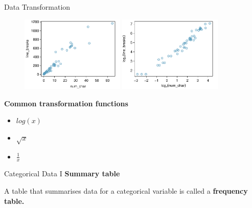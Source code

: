 \documentclass[12pt,a4paper]{beamer}
\begin{document}
\begin{frame}{Data Transformation}
\begin{figure}
\includegraphics[width=0.44\textwidth]{figures/email50LinesCharactersMod/email50LinesCharactersMod}
\includegraphics[width=0.44\textwidth]{figures/email50LinesCharactersMod/email50LinesCharactersModLog}
\end{figure}
\textbf{Common transformation functions}
\begin{itemize}
\item $log(x)$
\item $\sqrt{x}$
\item $\frac{1}{x}$
\end{itemize}
\end{frame}
\begin{frame}{Categorical Data I}
\textbf{Summary table}
\begin{table}[htb]
	\centering
	\end{table}
	A table that summarises data for a categorical variable is called a \textbf{frequency table.}
	\begin{table}[htb]
	\centering
	\end{table}
		
\end{frame}
\end{document}
